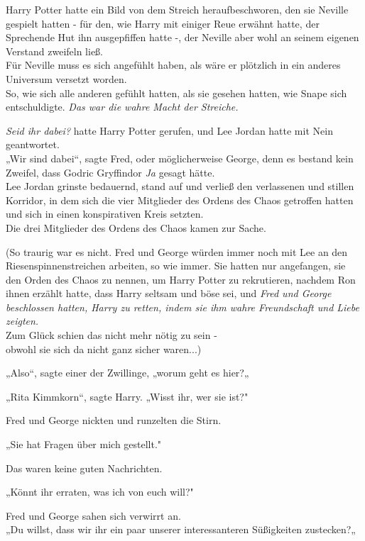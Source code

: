 {Harry Potter hatte ein Bild von dem Streich heraufbeschworen, den sie Neville gespielt hatten - für den, wie Harry mit einiger Reue erwähnt hatte, der Sprechende Hut ihn ausgepfiffen hatte -, der Neville aber wohl an seinem eigenen Verstand zweifeln ließ.\\ Für Neville muss es sich angefühlt haben, als wäre er plötzlich in ein anderes Universum versetzt worden.\\ So, wie sich alle anderen gefühlt hatten, als sie gesehen hatten, wie Snape sich entschuldigte. \emph{Das war die wahre Macht der Streiche.}

\emph{Seid ihr dabei?} hatte Harry Potter gerufen, und Lee Jordan hatte mit Nein geantwortet.\\ „Wir sind dabei“, sagte Fred, oder möglicherweise George, denn es bestand kein Zweifel, dass Godric Gryffindor \emph{Ja} gesagt hätte.\\ Lee Jordan grinste bedauernd, stand auf und verließ den verlassenen und stillen Korridor, in dem sich die vier Mitglieder des Ordens des Chaos getroffen hatten und sich in einen konspirativen Kreis setzten.\\ Die drei Mitglieder des Ordens des Chaos kamen zur Sache.

(So traurig war es nicht. Fred und George würden immer noch mit Lee an den Riesenspinnenstreichen arbeiten, so wie immer. Sie hatten nur angefangen, sie den Orden des Chaos zu nennen, um Harry Potter zu rekrutieren, nachdem Ron ihnen erzählt hatte, dass Harry seltsam und böse sei, und \emph{Fred und George beschlossen hatten, Harry zu retten, indem sie ihm wahre Freundschaft und Liebe zeigten.}\\ Zum Glück schien das nicht mehr nötig zu sein -\\ obwohl sie sich da nicht ganz sicher waren...)

„Also“, sagte einer der Zwillinge, „worum geht es hier?„

„Rita Kimmkorn“, sagte Harry. „Wisst ihr, wer sie ist?"

Fred und George nickten und runzelten die Stirn.

„Sie hat Fragen über mich gestellt."

Das waren keine guten Nachrichten.

„Könnt ihr erraten, was ich von euch will?"

Fred und George sahen sich verwirrt an.\\ „Du willst, dass wir ihr ein paar unserer interessanteren Süßigkeiten zustecken?„

}
